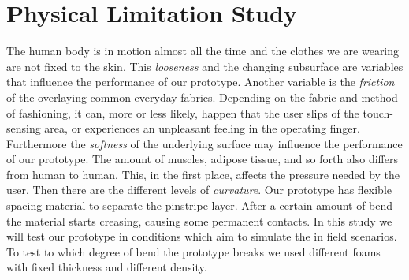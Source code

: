 \section{Physical Limitation Study}
The human body is in motion almost all the time and the clothes we are wearing are not fixed to the skin. This \emph{looseness} and the changing subsurface are variables that influence the performance of our prototype. Another variable is the \emph{friction} of the overlaying common everyday fabrics. Depending on the fabric and method of fashioning, it can, more or less likely, happen that the user slips of the touch-sensing area, or experiences an unpleasant feeling in the operating finger. Furthermore the \emph{softness} of the underlying surface may influence the performance of our prototype. The amount of muscles, adipose tissue, and so forth also differs from human to human. This, in the first place, affects the pressure needed by the user. Then there are the different levels of \emph{curvature}. Our prototype has flexible spacing-material to separate the pinstripe layer. After a certain amount of bend the material starts creasing, causing some permanent contacts. In this study we will test our prototype in conditions which aim to simulate the in field scenarios. To test to which degree of bend the prototype breaks we used different foams with fixed thickness and different density.

